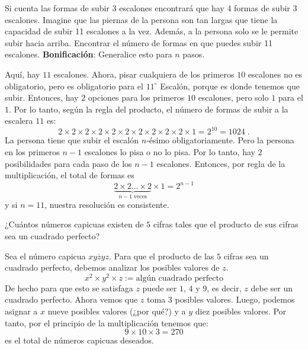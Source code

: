 \begin{ejemplo}
Si cuenta las formas de subir 3 escalones encontrará que hay 4 formas de subir 3 escalones. Imagine que las piernas de la persona son tan largas que tiene la capacidad de subir 11 escalones a la vez. Además, a la persona solo se le permite subir hacia arriba. Encontrar el número de formas en que puedes subir 11 escalones. \textbf{Bonificación}: Generalice esto para $n$ pasos.
\end{ejemplo}

\begin{solucion}
Aquí, hay $11$ escalones. Ahora, pisar cualquiera de los primeros $10$ escalones no es obligatorio, pero es obligatorio para el $11^\circ$ Escalón, porque es donde tenemos que subir. Entonces, hay $2$ opciones para los primeros $10$ escalones, pero solo $1$ para el $1$. Por lo tanto, según la regla del producto, el número de formas de subir a la escalera $11$ es:
\[2\times 2\times 2\times 2\times 2\times 2\times 2\times 2\times 2\times 2\times 1=2^{10}=1024\;. \]
La persona tiene que subir el escalón $n$-ésimo obligatoriamente. Pero la persona en los primeros $n-1$ escalones lo pisa o no lo pisa. Por lo tanto, hay $2$ posibilidades para cada paso de los $n-1$ escalones. Entonces, por regla de la multiplicación, el total de formas es \[\underbrace{2\times 2 \ldots \times 2}_{n-1\;\text{veces}}\times 1=2^{n-1}\]
y si $n=11$, nuestra resolución es consistente.
\end{solucion}

\begin{ejemplo}
¿Cuántos números capicuas existen de $5$ cifras tales que el producto de sus cifras sea un cuadrado perfecto?
\end{ejemplo}

\begin{solucion}
Sea el número capicua $\displaystyle \overline{xyzyz}$. Para que el producto de las $5$ cifras sea un cuadrado perfecto, debemos analizar los posibles valores de $z$.
\[x^2\times y^2\times z:=\text{algún cuadrado perfecto}\]
De hecho para que esto se satisfaga $z$ puede ser $1$, $4$ y $9$, es decir, $z$ debe ser un cuadrado perfecto. Ahora vemos que $z$ toma $3$ posibles valores. Luego, podemos asignar a $x$ nueve posibles valores (¿por qué?) y a $y$ diez posibles valores. Por tanto, por el principio de la multiplicación tenemos que:
\[9\times 10 \times 3=270\]
es el total de números capicuas deseados.
\end{solucion}

